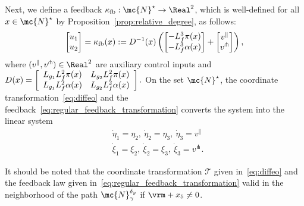 Next, we define a feedback $\kappa_{\mathrm{fb}}:\mc{N}^\star \to \Real^2 $, which is well-defined for all $x \in \mc{N}^\star$  by Proposition~\ref{prop:relative_degree}, as follows:
\begin{eqnarray}
\label{eq:regular_feedback_transformation}
 \left[\!\!\!
  \begin{array}{c}
      u_{1}\\
      u_{2}\\
  \end{array} \!\!\!\right]= \kappa_{\mathrm{fb}}(x):=D^{-1}(x)\left( \left[\!\!\!
  \begin{array}{c}
      -L_{f}^{3}\ak{\pi(x)}\\
      -L_{f}^{3}\ak{\alpha(x)}
  \end{array} \!\!\!\right]+
  \left[\!\!\!
  \begin{array}{c}
      v^{\parallel}\\
      v^{\pitchfork}\\
  \end{array} \!\!\!\right]
  \right),
\end{eqnarray}
where $(v^{\parallel},v^{\pitchfork}) \in \Real^{2}$ are
auxiliary control inputs and 
$
\label{eq:decoupling_matrix_general1}
 D(x)=
  \left[\begin{array}{c c}
      L_{g_{1}}L_{f}^{2}\pi(x) & L_{g_{2}}L_{f}^{2}\pi(x)\\
      L_{g_{1}}L_{f}^{2}\alpha(x) & L_{g_{2}}L_{f}^{2}\alpha(x)\\
  \end{array}\right].
$
On the set $\mc{N}^\star$, the coordinate transformation~\eqref{eq:diffeo} and the feedback~\eqref{eq:regular_feedback_transformation} converts the system into the linear system
\begin{subequations}
\label{eq:LTI_representation}
\begin{align}
    &\dot{\eta}_{1} =\eta_{2},\ \dot{\eta}_{2} =\eta_{3},\ \dot{\eta}_{3} =v^{\parallel}\label{eq:LTI_representationeta}\\
    &\dot{\xi}_{1} =\xi_{2},\  \dot{\xi}_{2} =\xi_{3}, \ \dot{\xi}_{3} =  v^{\pitchfork}\label{eq:LTI_representationxi}.
\end{align}
\end{subequations}
{
\begin{remark}
    It should be noted that the coordinate transformation ${\mathscr{T}}$ given in~\eqref{eq:diffeo} and the feedback law given in~\eqref{eq:regular_feedback_transformation}  valid in the neighborhood of the path $\mc{N}_{\gamma}^{\by}$ if $\vrm + x_5 \mynnd{\neq} 0$. 
\end{remark}

}
